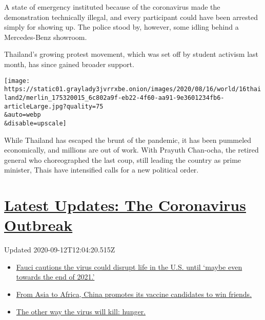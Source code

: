 A state of emergency instituted because of the coronavirus made the
demonstration technically illegal, and every participant could have been
arrested simply for showing up. The police stood by, however, some
idling behind a Mercedes-Benz showroom.

Thailand's growing protest movement, which was set off by student
activism last month, has since gained broader support.

\texttt{[image: https://static01.graylady3jvrrxbe.onion/images/2020/08/16/world/16thailand2/merlin\_175320015\_6c802a9f-eb22-4f60-aa91-9e3601234fb6-articleLarge.jpg?quality=75\\\&auto=webp\\\&disable=upscale]}

While Thailand has escaped the brunt of the pandemic, it has been
pummeled economically, and millions are out of work. With Prayuth
Chan-ocha, the retired general who choreographed the last coup, still
leading the country as prime minister, Thais have intensified calls for
a new political order.

\hypertarget{latest-updates-the-coronavirus-outbreak}{%
\section{\texorpdfstring{\href{https://www.nytimes3xbfgragh.onion/2020/09/11/world/covid-19-coronavirus.html?action=click\&pgtype=Article\&state=default\&region=MAIN_CONTENT_1\&context=storylines_live_updates}{Latest
Updates: The Coronavirus
Outbreak}}{Latest Updates: The Coronavirus Outbreak}}\label{latest-updates-the-coronavirus-outbreak}}

Updated 2020-09-12T12:04:20.515Z

\begin{itemize}
\tightlist
\item
  \href{https://www.nytimes3xbfgragh.onion/2020/09/11/world/covid-19-coronavirus.html?action=click\&pgtype=Article\&state=default\&region=MAIN_CONTENT_1\&context=storylines_live_updates\#link-dfb8a16}{Fauci
  cautions the virus could disrupt life in the U.S. until `maybe even
  towards the end of 2021.'}
\item
  \href{https://www.nytimes3xbfgragh.onion/2020/09/11/world/covid-19-coronavirus.html?action=click\&pgtype=Article\&state=default\&region=MAIN_CONTENT_1\&context=storylines_live_updates\#link-7104d154}{From
  Asia to Africa, China promotes its vaccine candidates to win friends.}
\item
  \href{https://www.nytimes3xbfgragh.onion/2020/09/11/world/covid-19-coronavirus.html?action=click\&pgtype=Article\&state=default\&region=MAIN_CONTENT_1\&context=storylines_live_updates\#link-393ad215}{The
  other way the virus will kill: hunger.}
\end{itemize}

